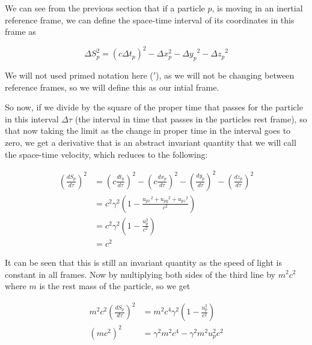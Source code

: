We can see from the previous section that if a particle $p$, is moving in an inertial reference frame, we can define the space-time interval of its coordinates in this frame as

\begin{equation}
	\Delta S_p^2 = (c\Delta {t}_p)^2-\Delta x_p^2-{\Delta y_p}^2-{\Delta z_p}^2
\end{equation}

We will not used primed notation here ($'$), as we will not be changing between reference frames, so we will define this as our intial frame.

So now, if we divide by the square of the proper time that passes for the particle in this interval ${\Delta\tau}$ (the interval in time that passes in the particles rest frame), so that now taking the limit as the change in proper time in the interval goes to zero, we get a derivative that is an abstract invariant quantity that we will call the space-time velocity, which reduces to the following:

\begin{equation}
	\begin{aligned}
		\left(\frac{dS_p}{d\tau}\right)^2 & = \left(c\frac{{{dt}_{p}}}{d\tau}\right)^2-\left(c\frac{dx_p}{d\tau}\right)^2-\left(\frac{dy_p}{d\tau}\right)^2-\left(\frac{dz_p}{d\tau}\right)^2 \\
		                                  & = {c}^2\gamma^2 \left( 1-\frac{{{u}_{px}}^2 + {{u}_{py}}^2 + {{u}_{pz}}^2}{{c}^2} \right)\\
										  & = {c}^2\gamma^2 \left( 1-\frac{u_p^2}{{c}^2} \right) \\
		                                  & = {c}^2
	\end{aligned}
\end{equation}

It can be seen that this is still an invariant quantity as the speed of light is constant in all frames.
Now by multiplying both sides of the third line by ${m}^2{c}^2$ where $m$ is the rest mass of the particle, so we get

\begin{equation}
	\label{eq: energy-momentum derivation}
	\begin{aligned}
		m^2 {c}^2 \left(\frac{dS_p}{d\tau}\right)^2 & = m^2{c}^4\gamma^2 \left( 1-\frac{u_p^2}{{c}^2} \right)  \\
		({m}{c}^2)^2                                & = \gamma^2 m^2 c^4-\gamma^2 m^2 u_p^2 {c}^2
	\end{aligned}
\end{equation}


